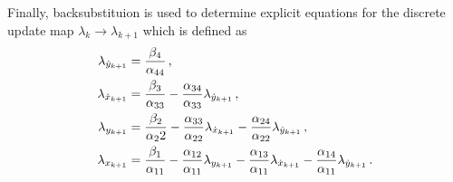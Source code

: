 \documentclass[letterpaper, paper,11pt]{AAS}		%
\begin{document}
Finally, backsubstituion is used to determine explicit equations for the discrete update map \( \lambda_k \to \lambda_{k+1} \) which is defined as
\begin{subequations}\label{eq:costate_update}
\begin{align}
	\lambda_{\dot{y}_{k+1}} &= \frac{\beta_4}{\alpha_{44}} \, ,\\
	\lambda_{\dot{x}_{k+1}} &= \frac{\beta_3}{\alpha_{33}} - \frac{\alpha_{34}}{\alpha_{33}} \lambda_{\dot{y}_{k+1}} \, ,\\
	\lambda_{y_{k+1}} &= \frac{\beta_2}{\alpha_22} - \frac{\alpha_{33}}{\alpha_{22}}\lambda_{\dot{x}_{k+1}} - \frac{\alpha_{24}}{\alpha_{22}} \lambda_{\dot{y}_{k+1}} \, ,\\
	\lambda_{x_{k+1}} &= \frac{\beta_1}{\alpha_{11}} - \frac{\alpha_{12}}{\alpha_{11}} \lambda_{y_{k+1}} - \frac{\alpha_{13}}{\alpha_{11}} \lambda_{\dot{x}_{k+1}} - \frac{\alpha_{14}}{\alpha_{11}} \lambda_{\dot{y}_{k+1}} \, .
\end{align}
\end{subequations}
\end{document}
